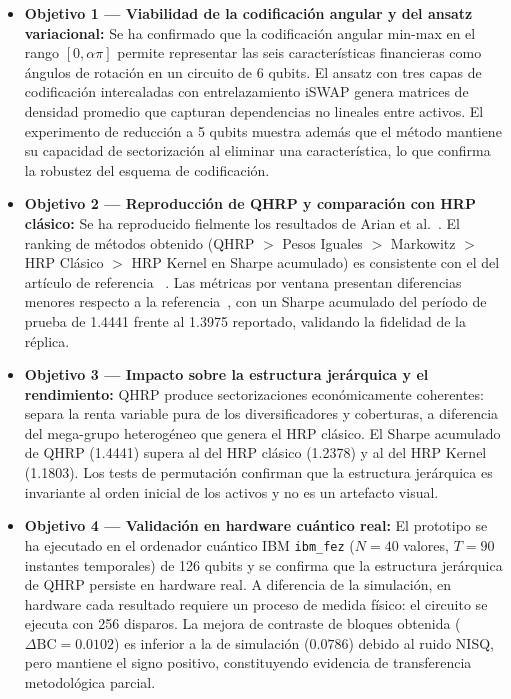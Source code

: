 \begin{itemize}
    \item \textbf{Objetivo 1 — Viabilidad de la codificación angular y del ansatz variacional:}
    Se ha confirmado que la codificación angular min-max en el rango $[0, \alpha\pi]$ permite representar las seis características financieras como ángulos de rotación en un circuito de 6 qubits. El ansatz con tres capas de codificación intercaladas con entrelazamiento iSWAP genera matrices de densidad promedio que capturan dependencias no lineales entre activos. El experimento de reducción a 5 qubits muestra además que el método mantiene su capacidad de sectorización al eliminar una característica, lo que confirma la robustez del esquema de codificación.

    \item \textbf{Objetivo 2 — Reproducción de QHRP y comparación con HRP clásico:}
    Se ha reproducido fielmente los resultados de Arian et al.~\cite{arian2025qhrp}. El ranking de métodos obtenido (QHRP $>$ Pesos Iguales $>$ Markowitz $>$ HRP Clásico $>$ HRP Kernel en Sharpe acumulado) es consistente con el del artículo de referencia ~\cite{arian2025qhrp}. Las métricas por ventana presentan diferencias menores respecto a la referencia~\cite{arian2025qhrp}, con un Sharpe acumulado del período de prueba de 1.4441 frente al 1.3975 reportado, validando la fidelidad de la réplica.

    \item \textbf{Objetivo 3 — Impacto sobre la estructura jerárquica y el rendimiento:}
    \gls{QHRP} produce sectorizaciones económicamente coherentes: separa la renta variable pura de los diversificadores y coberturas, a diferencia del mega-grupo heterogéneo que genera el HRP clásico. El Sharpe acumulado de \gls{QHRP} (1.4441) supera al del HRP clásico (1.2378) y al del HRP Kernel (1.1803). Los tests de permutación confirman que la estructura jerárquica es invariante al orden inicial de los activos y no es un artefacto visual.

    \item \textbf{Objetivo 4 — Validación en hardware cuántico real:}
    El prototipo se ha ejecutado en el ordenador cuántico IBM \texttt{ibm\_fez} (\(N=40\) valores, \(T=90\) instantes temporales) de 126 qubits y se confirma que la estructura jerárquica de \gls{QHRP} persiste en hardware real. A diferencia de la simulación, en hardware cada resultado requiere un proceso de medida físico: el circuito se ejecuta con 256 disparos. La mejora de contraste de bloques obtenida ($\Delta\mathrm{BC} = 0.0102$) es inferior a la de simulación ($0.0786$) debido al ruido \gls{NISQ}, pero mantiene el signo positivo, constituyendo evidencia de transferencia metodológica parcial.
\end{itemize}

